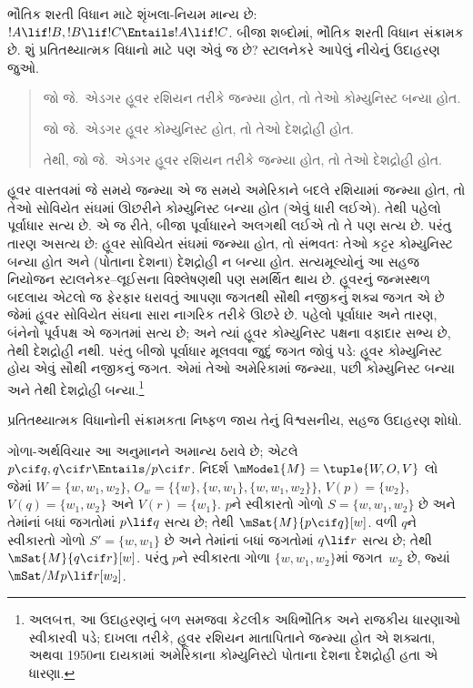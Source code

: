 \documentclass[../../../include/open-logic-section]{subfiles}
\begin{document}


ભૌતિક શરતી વિધાન માટે શૃંખલા-નિયમ માન્ય છે: $!A \lif !B, !B
\lif !C \Entails !A \lif !C$. બીજા શબ્દોમાં, ભૌતિક શરતી વિધાન
સંક્રામક છે. શું પ્રતિતથ્યાત્મક વિધાનો માટે પણ એવું જ છે? સ્ટાલનેકરે
આપેલું નીચેનું ઉદાહરણ જુઓ.
\begin{quote}
  જો જે.~એડગર હૂવર રશિયન તરીકે જન્મ્યા હોત, તો તેઓ કોમ્યુનિસ્ટ બન્યા હોત.

  જો જે.~એડગર હૂવર કોમ્યુનિસ્ટ હોત, તો તેઓ દેશદ્રોહી હોત.

  તેથી, જો જે.~એડગર હૂવર રશિયન તરીકે જન્મ્યા હોત, તો તેઓ દેશદ્રોહી હોત.
\end{quote}
હૂવર વાસ્તવમાં જે સમયે જન્મ્યા એ જ સમયે અમેરિકાને બદલે રશિયામાં
જન્મ્યા હોત, તો તેઓ સોવિયેત સંઘમાં ઊછરીને કોમ્યુનિસ્ટ બન્યા હોત
(એવું ધારી લઈએ). તેથી પહેલો પૂર્વાધાર સત્ય છે. એ જ રીતે, બીજા
પૂર્વાધારને અલગથી લઈએ તો તે પણ સત્ય છે. પરંતુ તારણ અસત્ય છે:
હૂવર સોવિયેત સંઘમાં જન્મ્યા હોત, તો સંભવતઃ તેઓ કટ્ટર કોમ્યુનિસ્ટ
બન્યા હોત અને (પોતાના દેશના) દેશદ્રોહી ન બન્યા હોત. સત્યમૂલ્યોનું
આ સહજ નિયોજન સ્ટાલનેકર--લૂઈસના વિશ્લેષણથી પણ સમર્થિત થાય છે.
હૂવરનું જન્મસ્થળ બદલાય એટલો જ ફેરફાર ધરાવતું આપણા જગતથી સૌથી
નજીકનું શક્ય જગત એ છે જેમાં હૂવર સોવિયેત સંઘના સારા નાગરિક તરીકે
ઊછરે છે. પહેલો પૂર્વાધાર અને તારણ, બંનેનો પૂર્વપક્ષ એ જગતમાં સત્ય
છે; અને ત્યાં હૂવર કોમ્યુનિસ્ટ પક્ષના વફાદાર સભ્ય છે, તેથી દેશદ્રોહી
નથી. પરંતુ બીજો પૂર્વાધાર મૂલવવા જુદું જગત જોવું પડે: હૂવર
કોમ્યુનિસ્ટ હોય એવું સૌથી નજીકનું જગત. એમાં તેઓ અમેરિકામાં જન્મ્યા,
પછી કોમ્યુનિસ્ટ બન્યા અને તેથી દેશદ્રોહી બન્યા.\footnote{અલબત્ત, આ
  ઉદાહરણનું બળ સમજવા કેટલીક અધિભૌતિક અને રાજકીય ધારણાઓ સ્વીકારવી
  પડે; દાખલા તરીકે, હૂવર રશિયન માતાપિતાને જન્મ્યા હોત એ શક્યતા,
  અથવા 1950ના દાયકામાં અમેરિકાના કોમ્યુનિસ્ટો પોતાના દેશના
  દેશદ્રોહી હતા એ ધારણા.}

\begin{prob}
  પ્રતિતથ્યાત્મક વિધાનોની સંક્રામકતા નિષ્ફળ જાય તેનું વિશ્વસનીય,
  સહજ ઉદાહરણ શોધો.
\end{prob}

\begin{ex}
  ગોળા-અર્થવિચાર આ અનુમાનને અમાન્ય ઠરાવે છે; એટલે $p
  \cif q, q \cif r \Entails/ p \cif r$. નિદર્શ $\mModel{M}
  = \tuple{W, O, V}$ લો જેમાં $W = \{w, w_1, w_2\}$,
  $O_w = \{\{w\}, \{w, w_1\}, \{w, w_1, w_2\}\}$,
  $V(p) = \{w_2\}$, $V(q) = \{w_1, w_2\}$ અને
  $V(r) = \{w_1\}$. $p$ને સ્વીકારતો ગોળો $S = \{w, w_1,
  w_2\}$ છે અને તેમાંનાં બધાં જગતોમાં $p \lif q$ સત્ય છે; તેથી
  $\mSat{M}{p \cif q}[w]$. વળી $q$ને સ્વીકારતો ગોળો
  $S' = \{w, w_1\}$ છે અને તેમાંનાં બધાં જગતોમાં
  $q \lif r$ સત્ય છે; તેથી
  $\mSat{M}{q \cif r}[w]$. પરંતુ $p$ને સ્વીકારતા ગોળા
  $\{w, w_1, w_2\}$માં જગત~$w_2$ છે, જ્યાં
  $\mSat/{M}{p \lif r}[w_2]$.
\end{ex}
\end{document}
